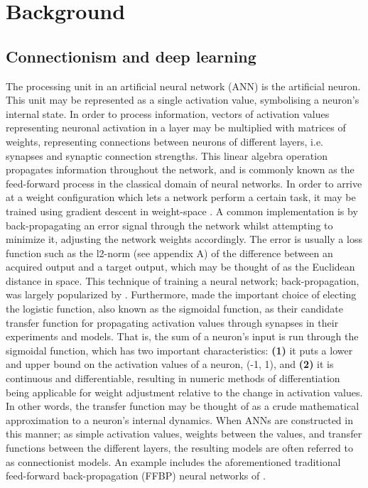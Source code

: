 
\chapter{Background}\label{chpt:background}

\section{Connectionism and deep learning}
The processing unit in an artificial neural network (ANN) is the artificial neuron. This unit may be represented as a single activation value, symbolising a neuron's internal state. In order to process information, vectors of activation values representing neuronal activation in a layer may be multiplied with matrices of weights, representing connections between neurons of different layers, i.e. synapses and synaptic connection strengths. This linear algebra operation propagates information throughout the network, and is commonly known as the feed-forward process in the classical domain of neural networks. In order to arrive at a weight configuration which lets a network perform a certain task, it may be trained using gradient descent in weight-space \citep{Hinton1989}. A common implementation is by  back-propagating an error signal through the network whilst attempting to minimize it, adjusting the network weights accordingly. The error is usually a loss function such as the l2-norm (see appendix A) of the difference between an acquired output and a target output, which may be thought of as the Euclidean distance in space. This technique of training a neural network; back-propagation, was largely popularized by \cite{Rumelhart1986}. Furthermore, \cite{Rumelhart1986} made the important choice of electing the logistic function, also known as the sigmoidal function, as their candidate transfer function for propagating activation values through synapses in their experiments and models. That is, the sum of a neuron's input is run through the sigmoidal function, which has two important characteristics: \textbf{(1)} it puts a lower and upper bound on the activation values of a neuron, (-1, 1), and \textbf{(2)} it is continuous and differentiable, resulting in numeric methods of differentiation being applicable for weight adjustment relative to the change in activation values. In other words, the transfer function may be thought of as a crude mathematical approximation to a neuron's internal dynamics.
When ANNs are constructed in this manner; as simple activation values, weights between the values, and transfer functions between the different layers, the resulting models are often referred to as connectionist models. An example includes the aforementioned traditional feed-forward back-propagation (FFBP) neural networks of \citep{Rumelhart1986}.

